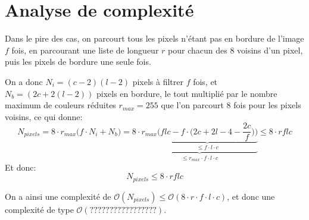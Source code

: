 \documentclass[a4paper, 11pt]{article}
\begin{document}
\section*{Analyse de complexité}
Dans le pire des cas, on parcourt tous les pixels n'étant pas en bordure de l'image $f$ fois, en parcourant une liste de longueur $r$ pour chacun des 8 voisins d'un pixel, puis les pixels de bordure une seule fois.

On a donc $N_i = (c - 2)(l-2)$ pixels à filtrer $f$ fois, et $N_b = (2c + 2(l-2))$ pixels en bordure, le tout multiplié par le nombre maximum de couleurs réduites $r_{max} = 255$ que l'on parcourt 8 fois pour les pixels voisins, ce qui donne:
$$N_{pixels} = 8 \cdot r_{max} \bigg(f \cdot N_i + N_b \bigg)
= 8 \cdot \underbrace{r_{max}\underbrace{\bigg(flc - f \cdot \bigg(2c + 2l - 4 - \frac{2c}{f}\bigg)\bigg)}_{\leq f\cdot l\cdot c}}_{\leq r_{max} \cdot f\cdot l\cdot c} \leq 8\cdot rflc$$
Et donc: $$N_{pixels} \leq 8\cdot rflc$$

On a ainsi une complexité de $\mathcal{O}(N_{pixels}) \leq \mathcal{O}(8\cdot r\cdot f\cdot l\cdot c)$, et donc une complexité de type $\mathcal{O}(?????????????????)$.
\end{document}
